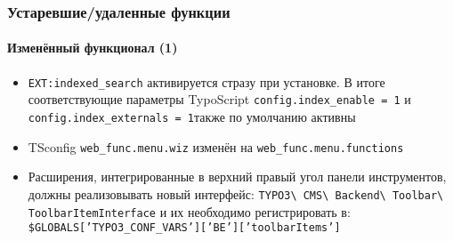 \begin{frame}[fragile]
	\frametitle{Устаревшие/удаленные функции}
	\framesubtitle{Изменённый функционал (1)}

	\begin{itemize}

		\item \texttt{EXT:indexed\_search} активируется стразу при установке.
			В итоге соответствующие параметры TypoScript \small\texttt{config.index\_enable = 1}\normalsize
			и \small\texttt{config.index\_externals = 1}\normalsize также по умолчанию активны
		
		\item TSconfig \small\texttt{web\_func.menu.wiz}\normalsize\space
			изменён на \small\texttt{web\_func.menu.functions}\normalsize

		\item Расширения, интегрированные в верхний правый угол панели инструментов, должны реализовывать новый интерфейс:
			\small
				\texttt{TYPO3\textbackslash
					CMS\textbackslash
					Backend\textbackslash
					Toolbar\textbackslash
					ToolbarItemInterface}
			\normalsize\newline
			и их необходимо регистрировать в:
			\small
				\texttt{\$GLOBALS['TYPO3\_CONF\_VARS']['BE']['toolbarItems']}
			\normalsize

	\end{itemize}

\end{frame}


